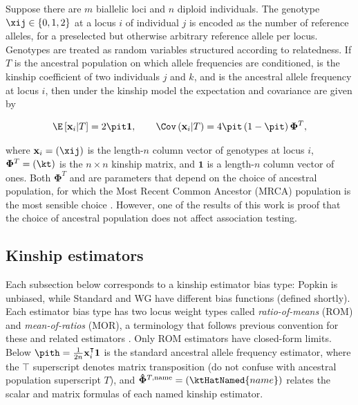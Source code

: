 \documentclass[11pt]{article}
\newcommand{\kinMat}[1][T]{%
  \ensuremath{%
    \mathbf{\Phi}^{#1}
  }%
  \xspace%
}%
\newcommand{\kinMatEstNamed}[1]{%
  \ensuremath{%
    \mathbf{\hat{\Phi}}^{T,\text{#1}}
  }%
  \xspace%
}%
\begin{document}
\begin{linenumbers}
Suppose there are $m$ biallelic loci and $n$ diploid individuals.
The genotype $\xij \in \{0,1,2\}$ at a locus $i$ of individual $j$ is encoded as the number of reference alleles, for a preselected but otherwise arbitrary reference allele per locus.
Genotypes are treated as random variables structured according to relatedness.
If $T$ is the ancestral population on which allele frequencies are conditioned, \kt is the kinship coefficient of two individuals $j$ and $k$, and \pit is the ancestral allele frequency at locus $i$, then under the kinship model \citep{malecot_mathematiques_1948, wright_genetical_1949, jacquard_structures_1970, astle_population_2009, ochoa_estimating_2021} the expectation and covariance are given by
\begin{linenomath*}
\begin{align*}
  \E \left[ \mathbf{x}_i \middle| T \right]
  =
    2 \pit \mathbf{1}
  ,
  \quad\quad
  \Cov \left(\mathbf{x}_i \middle| T \right)
  =
    4 \pit \left( 1 - \pit \right) \kinMat
    ,
\end{align*}
\end{linenomath*}
where $\mathbf{x}_i = (\xij)$ is the length-$n$ column vector of genotypes at locus $i$, $\kinMat = (\kt)$ is the $n \times n$ kinship matrix, and $\mathbf{1}$ is a length-$n$ column vector of ones.
Both \kinMat and \pit are parameters that depend on the choice of ancestral population, for which the Most Recent Common Ancestor (MRCA) population is the most sensible choice \citep{ochoa_estimating_2021}.
However, one of the results of this work is proof that the choice of ancestral population does not affect association testing.

\subsection{Kinship estimators}

Each subsection below corresponds to a kinship estimator bias type: Popkin is unbiased, while Standard and WG have different bias functions (defined shortly).
Each estimator bias type has two locus weight types called \textit{ratio-of-means} (ROM) and \textit{mean-of-ratios} (MOR), a terminology that follows previous convention for these and related estimators \citep{bhatia_estimating_2013, ochoa_estimating_2021}.
Only ROM estimators have closed-form limits.
Below
$
\pith
=
\frac{1}{2n} \mathbf{x}_i^\intercal \mathbf{1}
$
is the standard ancestral allele frequency estimator,
where the $\intercal$ superscript denotes matrix transposition (do not confuse with ancestral population superscript $T$),
and
$\kinMatEstNamed{name} = (\ktHatNamed{name})$
relates the scalar and matrix formulas of each named kinship estimator.


\end{linenumbers}
\end{document}
